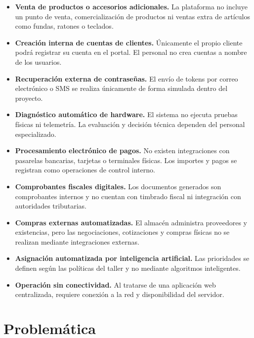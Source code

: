\begin{itemize}
    \item \textbf{Venta de productos o accesorios adicionales.} La plataforma no incluye un punto de venta, comercialización de productos ni ventas extra de artículos como fundas, ratones o teclados.

    \item \textbf{Creación interna de cuentas de clientes.} Únicamente el propio cliente podrá registrar su cuenta en el portal. El personal no crea cuentas a nombre de los usuarios.

    \item \textbf{Recuperación externa de contraseñas.} El envío de tokens por correo electrónico o SMS se realiza únicamente de forma simulada dentro del proyecto.

    \item \textbf{Diagnóstico automático de hardware.} El sistema no ejecuta pruebas físicas ni telemetría. La evaluación y decisión técnica dependen del personal especializado.

    \item \textbf{Procesamiento electrónico de pagos.} No existen integraciones con pasarelas bancarias, tarjetas o terminales físicas. Los importes y pagos se registran como operaciones de control interno.

    \item \textbf{Comprobantes fiscales digitales.} Los documentos generados son comprobantes internos y no cuentan con timbrado fiscal ni integración con autoridades tributarias.

    \item \textbf{Compras externas automatizadas.} El almacén administra proveedores y existencias, pero las negociaciones, cotizaciones y compras físicas no se realizan mediante integraciones externas.

    \item \textbf{Asignación automatizada por inteligencia artificial.} Las prioridades se definen según las políticas del taller y no mediante algoritmos inteligentes.

    \item \textbf{Operación sin conectividad.} Al tratarse de una aplicación web centralizada, requiere conexión a la red y disponibilidad del servidor.
\end{itemize}

\section{Problemática}

